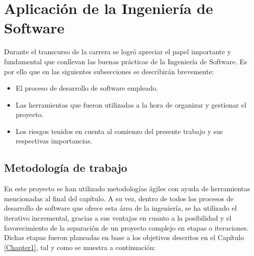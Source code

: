 \section{Aplicación de la Ingeniería de Software} \label{sec:hIngSW}

Durante el transcurso de la carrera se logró apreciar el papel importante y
fundamental que conllevan las buenas prácticas de la Ingeniería de Software. Es por ello que en las siguientes subsecciones se describirán brevemente:

\begin{itemize}
\item{El proceso de desarrollo de software empleado.}
\item{Las herramientas que fueron utilizadas a la hora de organizar y gestionar el proyecto.}
\item{Los riesgos tenidos en cuenta al comienzo del presente trabajo y sus respectivas importancias.}
\end{itemize} 


\subsection  {Metodología de trabajo}

En este proyecto se han utilizado metodologías ágiles con ayuda  de herramientas mencionadas al final del capítulo. A su vez, dentro de todos los procesos de desarrollo de software que ofrece esta área de la ingeniería, se ha utilizado el iterativo incremental, gracias a sus ventajas en cuanto a la posibilidad y el favorecimiento de la separación de un proyecto complejo en etapas o iteraciones. Dichas etapas fueron planeadas en base a los objetivos descritos en el Capítulo \ref{Chapter1}, tal y como se muestra a continuación:

